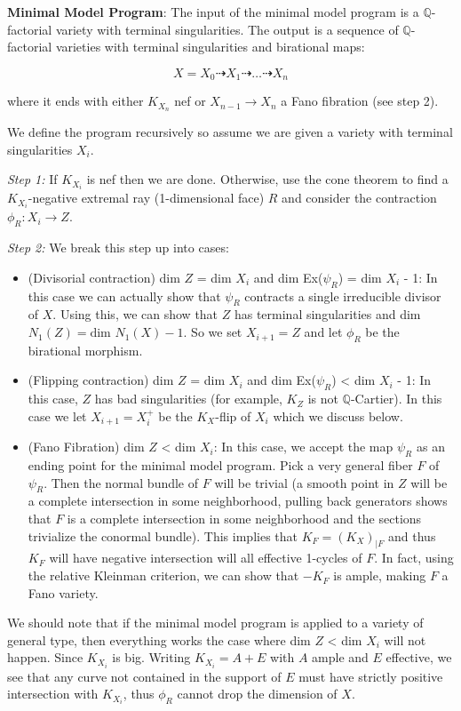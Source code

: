 \documentclass[a4paper]{article}
\numberwithin{theorem}{section}
\begin{document}
\textbf{Minimal Model Program}: The input of the minimal model program is a $\mathbb{Q}$-factorial variety with terminal singularities. The output is a sequence of $\mathbb{Q}$-factorial varieties with terminal singularities and birational maps:

$$ X = X_0 \dashrightarrow X_1 \dashrightarrow \dots \dashrightarrow X_n$$

where it ends with either $K_{X_n}$ nef or $X_{n-1} \rightarrow X_n$ a Fano fibration (see step 2).

We define the program recursively so assume we are given a variety with terminal singularities $X_i$.

\textit{Step 1:} If $K_{X_i}$ is nef then we are done. Otherwise, use the cone theorem to find a $K_{X_i}$-negative extremal ray (1-dimensional face) $R$ and consider the contraction $\phi_R: X_i \rightarrow Z$.

\textit{Step 2:} We break this step up into cases:
\begin{itemize}
\item (Divisorial contraction) dim $Z$ = dim $X_i$ and dim Ex($\psi_R$) = dim $X_i$ - 1: In this case we can actually show that $\psi_R$ contracts a single irreducible divisor of $X$. Using this, we can show that $Z$ has terminal singularities and dim $N_1(Z) = \text{dim } N_1(X) - 1$. So we set $X_{i+1} = Z$ and let $\phi_R$ be the birational morphism.
\item (Flipping contraction) dim $Z$ = dim $X_i$ and dim Ex($\psi_R$) < dim $X_i$ - 1: In this case, $Z$ has bad singularities (for example, $K_Z$ is not $\mathbb{Q}$-Cartier). In this case we let $X_{i+1} = X_i^+$ be the $K_X$-flip of $X_i$ which we discuss below.

\item (Fano Fibration) dim $Z$ < dim $X_i$: In this case, we accept the map $\psi_R$ as an ending point for the minimal model program. Pick a very general fiber $F$ of $\psi_R$. Then the normal bundle of $F$ will be trivial (a smooth point in $Z$ will be a complete intersection in some neighborhood, pulling back generators shows that $F$ is a complete intersection in some neighborhood and the sections trivialize the conormal bundle). This implies that $K_F = (K_X)_{|F}$ and thus $K_F$ will have negative intersection will all effective 1-cycles of $F$. In fact, using the relative Kleinman criterion, we can show that $-K_F$ is ample, making $F$ a Fano variety. 
\end{itemize}

We should note that if the minimal model program is applied to a variety of general type, then everything works the case where dim $Z$ < dim $X_i$ will not happen. Since $K_{X_i}$ is big. Writing $K_{X_i} = A + E$ with $A$ ample and $E$ effective, we see that any curve not contained in the support of $E$ must have strictly positive intersection with $K_{X_i}$, thus $\phi_R$ cannot drop the dimension of $X$.
\end{document}
